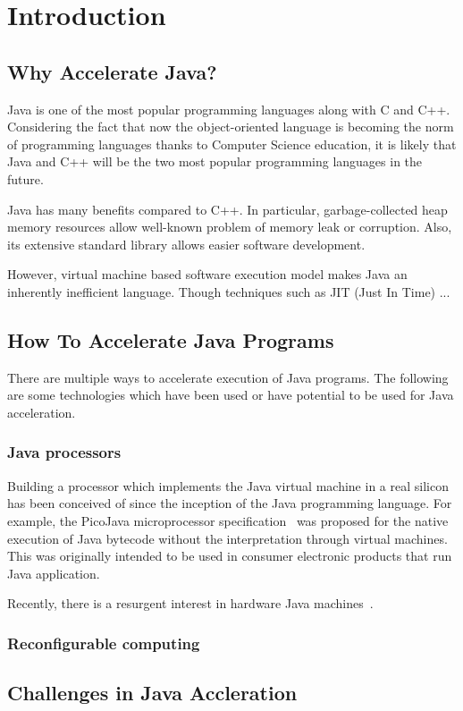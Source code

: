 \chapter{Introduction}


\section{Why Accelerate Java?}
Java is one of the most popular programming languages along with C and
C++. Considering the fact that now the object-oriented language is becoming
the norm of programming languages thanks to Computer Science education, it is
likely that Java and C++ will be the two most popular programming languages
in the future. 

Java has many benefits compared to C++. In particular, garbage-collected heap
memory resources allow well-known problem of memory leak or corruption. Also,
its extensive standard library allows easier software development. 

However, virtual machine based software execution model makes Java an
inherently inefficient language. Though techniques such as JIT (Just In Time)
...

\section{How To Accelerate Java Programs}
There are multiple ways to accelerate execution of Java programs. The
following are some technologies which have been used or have potential to be
used for Java acceleration.

\subsection{Java processors}
Building a processor which implements the Java virtual machine in a real
silicon has been conceived of since the inception of the Java programming
language. For example, the PicoJava microprocessor specification~\cite{MO98}
was proposed for the native execution of Java bytecode without the
interpretation through virtual machines. This was originally intended to be
used in consumer electronic products that run Java application. 

Recently, there is a resurgent interest in hardware Java
machines~\cite{Schoeberl09}. 

\subsection{Reconfigurable computing}

\section{Challenges in Java Accleration}

